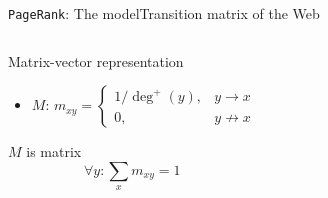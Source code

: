 \documentclass[xcolor=table,final]{beamer} %
\newcommand{\PageRank}{\texttt{PageRank}\xspace}
\begin{document}
\begin{frame}{\PageRank : The model}{Transition matrix of the Web}
\begin{columns}
   \begin{block}{Matrix-vector representation}
     \begin{itemize}
     \item $M$: 
       $m_{xy}=\begin{cases}1/\deg^+(y), & y \to x\\ 0, &y \not\to x \end{cases}$
     \end{itemize}
     $M$ is  matrix
     \begin{equation*}
       \forall y: \sum_x m_{xy} = 1
     \end{equation*}
   \end{block}
  \end{columns}

\end{frame}
\end{document}
